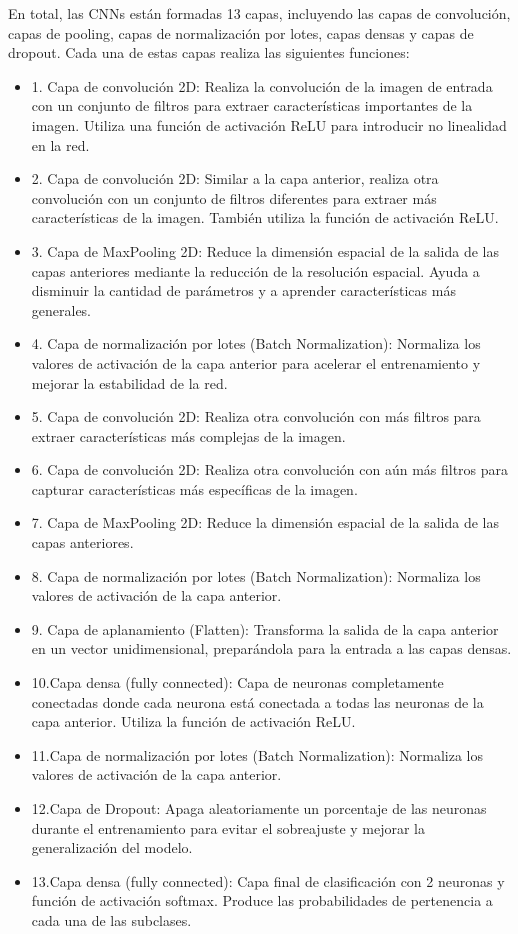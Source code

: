 En total, las CNNs están formadas 13 capas, incluyendo las capas de convolución, capas de pooling, capas de normalización por lotes, capas densas y capas de dropout. Cada una de estas capas realiza las siguientes funciones:\\

\begin{itemize}
\item 1.	Capa de convolución 2D: Realiza la convolución de la imagen de entrada con un conjunto de filtros para extraer características importantes de la imagen. Utiliza una función de activación ReLU para introducir no linealidad en la red.
\item 2.	Capa de convolución 2D: Similar a la capa anterior, realiza otra convolución con un conjunto de filtros diferentes para extraer más características de la imagen. También utiliza la función de activación ReLU.
\item 3.	Capa de MaxPooling 2D: Reduce la dimensión espacial de la salida de las capas anteriores mediante la reducción de la resolución espacial. Ayuda a disminuir la cantidad de parámetros y a aprender características más generales.
\item 4.	Capa de normalización por lotes (Batch Normalization): Normaliza los valores de activación de la capa anterior para acelerar el entrenamiento y mejorar la estabilidad de la red.
\item 5.	Capa de convolución 2D: Realiza otra convolución con más filtros para extraer características más complejas de la imagen.
\item 6.	Capa de convolución 2D: Realiza otra convolución con aún más filtros para capturar características más específicas de la imagen.
\item 7.	Capa de MaxPooling 2D: Reduce la dimensión espacial de la salida de las capas anteriores.
\item 8.	Capa de normalización por lotes (Batch Normalization): Normaliza los valores de activación de la capa anterior.
\item 9.	Capa de aplanamiento (Flatten): Transforma la salida de la capa anterior en un vector unidimensional, preparándola para la entrada a las capas densas.
\item 10.Capa densa (fully connected): Capa de neuronas completamente conectadas donde cada neurona está conectada a todas las neuronas de la capa anterior. Utiliza la función de activación ReLU.
\item 11.Capa de normalización por lotes (Batch Normalization): Normaliza los valores de activación de la capa anterior.
\item 12.Capa de Dropout: Apaga aleatoriamente un porcentaje de las neuronas durante el entrenamiento para evitar el sobreajuste y mejorar la generalización del modelo.
\item 13.Capa densa (fully connected): Capa final de clasificación con 2 neuronas y función de activación softmax. Produce las probabilidades de pertenencia a cada una de las subclases.
\end{itemize}


